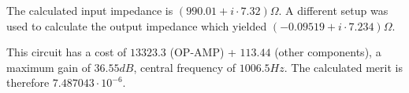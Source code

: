 \par

The calculated input impedance is $(990.01+i\cdot 7.32) \Omega$.
A different setup was used to calculate the output impedance which yielded $(-0.09519+i\cdot 7.234) \Omega$.

This circuit has a cost of $13323.3$ (OP-AMP) + $113.44$ (other components), a maximum gain of $36.55 dB$, central frequency of $1006.5 Hz$.
The calculated merit is therefore $7.487043\cdot10^{-6}$.

